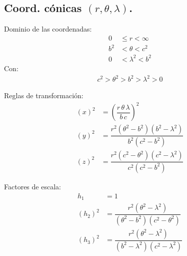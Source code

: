 \subsection{Coord. cónicas \texorpdfstring{$(r, \theta, \lambda)$}{(r, t, l)}.}

Dominio de las coordenadas:
\begin{align*}
0 &\leq r < \infty \\
b^{2} &< \theta < c^{2} \\
0 &< \lambda^{2} < b^{2}
\end{align*}
Con:
\begin{align*}
c^{2} > \theta^{2} > b^{2} > \lambda^{2} > 0
\end{align*}

Reglas de transformación:
\begin{align*}
(x)^{2} &= \left( \dfrac{r \, \theta \, \lambda}{b \, c} \right)^{2} \\[0.5em]
(y)^{2} &= \dfrac{r^{2} (\theta^{2} - b^{2})(b^{2} - \lambda^{2})}{b^{2}(c^{2} - b^{2})} \\[0.5em]
(z)^{2} &= \dfrac{r^{2} (c^{2} - \theta^{2})(c^{2} - \lambda^{2})}{c^{2} (c^{2} - b^{2})}
\end{align*}

Factores de escala:
\begin{align*}
h_{1} &= 1\\
(h_{2})^{2} &= \dfrac{r^{2} (\theta^{2} - \lambda^{2})}{(\theta^{2} - b^{2})(c^{2} - \theta^{2})} \\[0.5em]
(h_{3})^{2} &= \dfrac{r^{2} (\theta^{2} - \lambda^{2})}{(b^{2} - \lambda^{2})(c^{2} - \lambda^{2})}
\end{align*}

